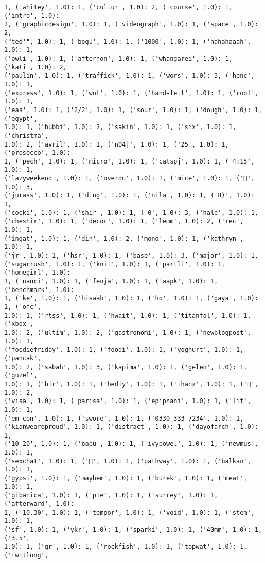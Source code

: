 \documentclass[11pt]{article}
\begin{document}
\begin{Verbatim}[commandchars=\\\{\}]
1, ('whitey', 1.0): 1, ('cultur', 1.0): 2, ('course', 1.0): 1, ('intro', 1.0):
2, ('graphicdesign', 1.0): 1, ('videograph', 1.0): 1, ('space', 1.0): 2,
("ted'", 1.0): 1, ('bogu', 1.0): 1, ('1000', 1.0): 1, ('hahahaaah', 1.0): 1,
('owli', 1.0): 1, ('afternon', 1.0): 1, ('whangarei', 1.0): 1, ('kati', 1.0): 2,
('paulin', 1.0): 1, ('traffick', 1.0): 1, ('wors', 1.0): 3, ('henc', 1.0): 1,
('express', 1.0): 1, ('wot', 1.0): 1, ('hand-lett', 1.0): 1, ('roof', 1.0): 1,
('eas', 1.0): 1, ('2/2', 1.0): 1, ('sour', 1.0): 1, ('dough', 1.0): 1, ('egypt',
1.0): 1, ('hubbi', 1.0): 2, ('sakin', 1.0): 1, ('six', 1.0): 1, ('christma',
1.0): 2, ('avril', 1.0): 1, ('n04j', 1.0): 1, ('25', 1.0): 1, ('prosecco', 1.0):
1, ('pech', 1.0): 1, ('micro', 1.0): 1, ('catspj', 1.0): 1, ('4:15', 1.0): 1,
('lazyweekend', 1.0): 1, ('overdu', 1.0): 1, ('mice', 1.0): 1, ('💃', 1.0): 3,
('jurass', 1.0): 1, ('ding', 1.0): 1, ('nila', 1.0): 1, ('8)', 1.0): 1,
('cooki', 1.0): 1, ('shir', 1.0): 1, ('0', 1.0): 3, ('hale', 1.0): 1,
('cheshir', 1.0): 1, ('decor', 1.0): 1, ('lemm', 1.0): 2, ('rec', 1.0): 1,
('ingat', 1.0): 1, ('din', 1.0): 2, ('mono', 1.0): 1, ('kathryn', 1.0): 1,
('jr', 1.0): 1, ('hsr', 1.0): 1, ('base', 1.0): 3, ('major', 1.0): 1,
('sugarrush', 1.0): 1, ('knit', 1.0): 1, ('partli', 1.0): 1, ('homegirl', 1.0):
1, ('nanci', 1.0): 1, ('fenja', 1.0): 1, ('aapk', 1.0): 1, ('benchmark', 1.0):
1, ('ke', 1.0): 1, ('hisaab', 1.0): 1, ('ho', 1.0): 1, ('gaya', 1.0): 1, ('ofc',
1.0): 1, ('rtss', 1.0): 1, ('hwait', 1.0): 1, ('titanfal', 1.0): 1, ('xbox',
1.0): 2, ('ultim', 1.0): 2, ('gastronomi', 1.0): 1, ('newblogpost', 1.0): 1,
('foodiefriday', 1.0): 1, ('foodi', 1.0): 1, ('yoghurt', 1.0): 1, ('pancak',
1.0): 2, ('sabah', 1.0): 3, ('kapima', 1.0): 1, ('gelen', 1.0): 1, ('guzel',
1.0): 1, ('bir', 1.0): 1, ('hediy', 1.0): 1, ('thanx', 1.0): 1, ('💞', 1.0): 2,
('visa', 1.0): 1, ('parisa', 1.0): 1, ('epiphani', 1.0): 1, ('lit', 1.0): 1,
('em-con', 1.0): 1, ('swore', 1.0): 1, ('0330 333 7234', 1.0): 1,
('kianweareproud', 1.0): 1, ('distract', 1.0): 1, ('dayofarch', 1.0): 1,
('10-20', 1.0): 1, ('bapu', 1.0): 1, ('ivypowel', 1.0): 1, ('newmus', 1.0): 1,
('sexchat', 1.0): 1, ('🍅', 1.0): 1, ('pathway', 1.0): 1, ('balkan', 1.0): 1,
('gypsi', 1.0): 1, ('mayhem', 1.0): 1, ('burek', 1.0): 1, ('meat', 1.0): 1,
('gibanica', 1.0): 1, ('pie', 1.0): 1, ('surrey', 1.0): 1, ('afterward', 1.0):
1, ('10.30', 1.0): 1, ('tempor', 1.0): 1, ('void', 1.0): 1, ('stem', 1.0): 1,
('sf', 1.0): 1, ('ykr', 1.0): 1, ('sparki', 1.0): 1, ('40mm', 1.0): 1, ('3.5',
1.0): 1, ('gr', 1.0): 1, ('rockfish', 1.0): 1, ('topwat', 1.0): 1, ('twitlong',

\end{Verbatim}
\end{document}
